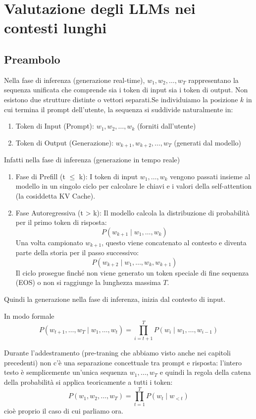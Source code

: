 \chapter{Valutazione degli LLMs nei contesti lunghi}

\section{Preambolo}
Nella fase di inferenza (generazione real-time), $w_1, w_2, \dots, w_T$ rappresentano la sequenza unificata che comprende sia i token di input sia i token di output. Non esistono due strutture distinte o vettori separati.Se individuiamo la posizione $k$ in cui termina il prompt dell'utente, la sequenza si suddivide naturalmente in:
\begin{enumerate}
    \item Token di Input (Prompt): $w_1, w_2, \dots, w_k$ (forniti dall'utente)
    \item Token di Output (Generazione): $w_{k+1}, w_{k+2}, \dots, w_T$ (generati dal modello)
\end{enumerate}
Infatti nella fase di inferenza (generazione in tempo reale)
\begin{enumerate}
    \item Fase di Prefill (t $\le$ k): I token di input $w_1, \dots, w_k$ vengono passati insieme al modello in un singolo ciclo per calcolare le chiavi e i valori della self-attention (la cosiddetta KV Cache).
    \item Fase Autoregressiva (t > k): Il modello calcola la distribuzione di probabilità per il primo token di risposta:$$P(w_{k+1} \mid w_1, \dots, w_k)$$Una volta campionato $w_{k+1}$, questo viene concatenato al contesto e diventa parte della storia per il passo successivo:$$P(w_{k+2} \mid w_1, \dots, w_k, w_{k+1})$$Il ciclo prosegue finché non viene generato un token speciale di fine sequenza (EOS) o non si raggiunge la lunghezza massima $T$.
\end{enumerate}
\begin{center}
    Quindi la generazione nella fase di inferenza, inizia dal contesto di input.
\end{center}
In modo formale
$$P(w_{t+1}, \dots, w_T \mid w_1, \dots, w_t) = \prod_{i=t+1}^{T} P(w_i \mid w_1, \dots, w_{i-1})$$

Durante l'addestramento (pre-traning che abbiamo visto anche nei capitoli precedenti) non c'è una separazione concettuale tra prompt e risposta: l'intero testo è semplicemente un'unica sequenza $w_1, \dots, w_T$
e quindi la regola della catena della probabilità si applica teoricamente a tutti i token:$$P(w_1, w_2, \dots, w_T) = \prod_{t=1}^{T} P(w_t \mid w_{<t})$$
cioè proprio il caso di cui parliamo ora.

